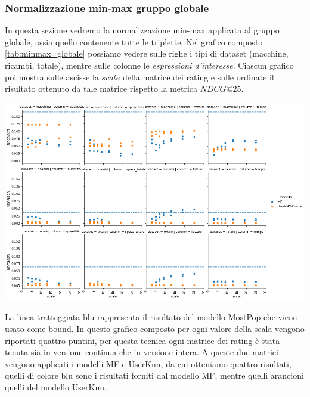 

\subsubsection{Normalizzazione min-max gruppo globale}
In questa sezione vedremo la normalizzazione min-max applicata al gruppo globale, ossia quello contenente tutte le triplette.
Nel grafico composto \ref{tab:minmax_globale} possiamo vedere sulle righe i tipi di dataset (macchine, ricambi, totale), mentre sulle colonne le \textit{espressioni d'interesse}. Ciascun grafico poi mostra sulle ascisse la $scale$ della matrice dei rating e sulle ordinate il risultato ottenuto da tale matrice rispetto la metrica $NDCG@25$.
\begin{center}
    \includegraphics[width=16cm]{figures/risultati_minmax_globale.png}
    \label{tab:minmax_globale}
\end{center}
La linea tratteggiata blu rappresenta il risultato del modello MostPop che viene usato come bound.
In questo grafico composto per ogni valore della scala vengono riportati quattro puntini, per questa tecnica ogni matrice dei rating è stata tenuta sia in versione continua che in versione intera. A queste due matrici vengono applicati i modelli MF e UserKnn, da cui otteniamo quattro risultati, quelli di colore blu sono i risultati forniti dal modello MF, mentre quelli arancioni quelli del modello UserKnn.


